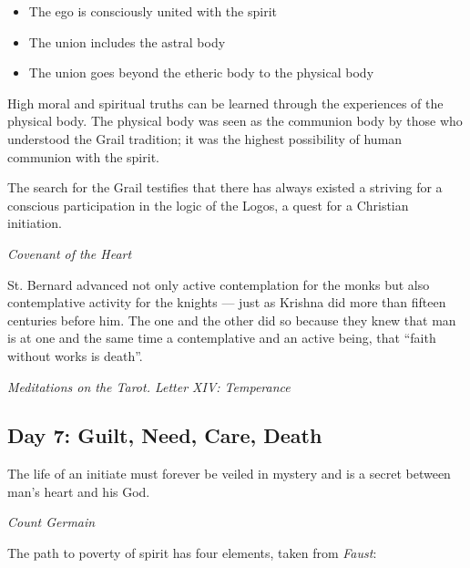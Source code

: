 \begin{itemize}
\item The ego is consciously united with the spirit 
\item The union includes the astral body 
\item The union goes beyond the etheric body to the physical body 
\end{itemize}
High moral and spiritual truths can be learned through the experiences of the physical body. The physical body was seen
as the communion body by those who understood the Grail tradition; it was the highest possibility of human communion
with the spirit.

\begin{quotationx}
The search for the Grail testifies that there has always existed a striving for a conscious participation in the logic
of the Logos, a quest for a Christian initiation. \begin{flushright}\textit{Covenant of the Heart}\end{flushright}

St. Bernard advanced not only active contemplation for the monks but also contemplative activity for the knights
— just as Krishna did more than fifteen centuries before him. The one and the other did so because
they knew that man is at one and the same time a contemplative and an active being, that “faith without works is
death”. 
\begin{flushright}\textit{Meditations on the Tarot. Letter XIV: Temperance}\end{flushright}

\end{quotationx}
\subsection*{Day 7: Guilt, Need, Care, Death}
\begin{quotationx}
The life of an initiate must forever be veiled in mystery and is a secret between man's heart and
his God. 

\begin{flushright}\textit{Count Germain}\end{flushright}

\end{quotationx}
The path to poverty of spirit has four elements, taken from \emph{Faust}:

